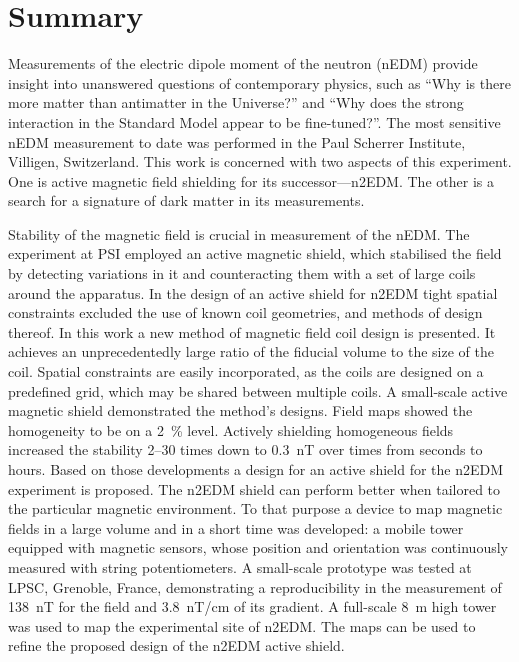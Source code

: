 

\begingroup
\let\clearpage\relax
\let\cleardoublepage\relax
\let\cleardoublepage\relax

\chapter*{Summary} %
Measurements of the electric dipole moment of the neutron (nEDM) provide insight into unanswered questions of contemporary physics, such as ``Why is there more matter than antimatter in the Universe?'' and ``Why does the strong interaction in the Standard Model appear to be fine-tuned?''. The most sensitive nEDM measurement to date was performed in the Paul Scherrer Institute, Villigen, Switzerland. This work is concerned with two aspects of this experiment. One is active magnetic field shielding for its successor---n2EDM\@. The other is a search for a signature of dark matter in its measurements.

Stability of the magnetic field is crucial in measurement of the nEDM\@. The experiment at PSI employed an active magnetic shield, which stabilised the field by detecting  variations in it and counteracting them with a set of large coils around the apparatus.
In the design of an active shield for n2EDM tight spatial constraints excluded the use of known coil geometries, and methods of design thereof.
In this work a new method of magnetic field coil design is presented. It achieves an unprecedentedly large ratio of the fiducial volume to the size of the coil.
Spatial constraints are easily incorporated, as the coils are designed on a predefined grid, which may be shared between multiple coils.
A small-scale active magnetic shield demonstrated the method's designs. Field maps showed the homogeneity to be on a \SI{2}{\percent} level.
Actively shielding homogeneous fields increased the stability 2--30 times down to \SI{0.3}{nT} over times from seconds to hours.
Based on those developments a design for an active shield for the n2EDM experiment is proposed.
The n2EDM shield can perform better when tailored to the particular magnetic environment. To that purpose a device to map magnetic fields in a large volume and in a short time was developed: a mobile tower equipped with magnetic sensors, whose position and orientation was continuously measured with string potentiometers. A small-scale prototype was tested at LPSC, Grenoble, France, demonstrating a reproducibility in the measurement of \SI{138}{nT} for the field and \SI{3.8}{nT/cm} of its gradient. A full-scale \SI{8}{m} high tower was used to map the experimental site of n2EDM\@. The maps can be used to refine the proposed design of the n2EDM active shield.

